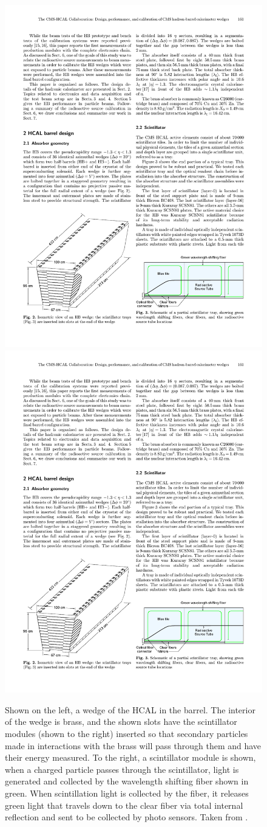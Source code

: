     \begin{figure}[h!]
      \centering
      \includegraphics[width=.45\textwidth]{figures/hcal_wedge.pdf}
      \includegraphics[width=.45\textwidth]{figures/hcal_scintillator.pdf}
      \caption[A wedge of the HCAL in the barrel and a scintillator module]{Shown on the left, a wedge of the HCAL in the barrel. The interior of the wedge is brass, and the shown slots have the scintillator modules (shown to the right) inserted so that secondary particles made in interactions with the brass will pass through them and have their energy measured. To the right, a scintillator module is shown, when a charged particle passes through the scintillator, light is generated and collected by the wavelength shifting fiber shown in green. When scintillation light is collected by the fiber, it releases green light that travels down to the clear fiber via total internal reflection and sent to be collected by photo sensors. Taken from \cite{cms_hcal_wedge}.}
      \label{fig:hcal_wedge}
    \end{figure}

